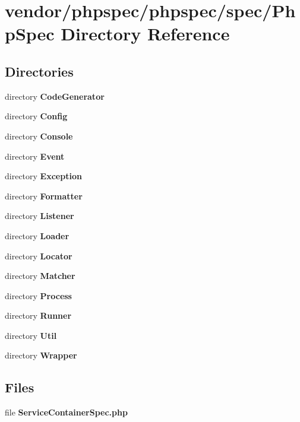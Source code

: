 \section{vendor/phpspec/phpspec/spec/\+Php\+Spec Directory Reference}
\label{dir_53bf3007a318aa2fe429e71b5b4685c6}
\subsection*{Directories}
\begin{DoxyCompactItemize}
\item 
directory {\bf Code\+Generator}
\item 
directory {\bf Config}
\item 
directory {\bf Console}
\item 
directory {\bf Event}
\item 
directory {\bf Exception}
\item 
directory {\bf Formatter}
\item 
directory {\bf Listener}
\item 
directory {\bf Loader}
\item 
directory {\bf Locator}
\item 
directory {\bf Matcher}
\item 
directory {\bf Process}
\item 
directory {\bf Runner}
\item 
directory {\bf Util}
\item 
directory {\bf Wrapper}
\end{DoxyCompactItemize}
\subsection*{Files}
\begin{DoxyCompactItemize}
\item 
file {\bf Service\+Container\+Spec.\+php}
\end{DoxyCompactItemize}
